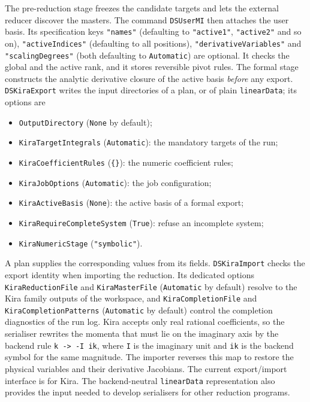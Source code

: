 \documentclass[11pt,a4paper]{article}
\begin{document}
The pre-reduction stage freezes the candidate
targets and lets the external reducer discover the
masters. The command \texttt{DSUserMI} then attaches the user basis. Its specification keys
\texttt{"names"} (defaulting to \texttt{"active1"}, \texttt{"active2"} and so on),
\texttt{"activeIndices"} (defaulting to all positions), \texttt{"derivativeVariables"} and
\texttt{"scalingDegrees"} (both defaulting to \texttt{Automatic}) are optional. It checks the global
and the active rank, and it stores reversible pivot rules. The formal stage constructs the analytic
derivative closure of the active basis \emph{before} any export.
\texttt{DSKiraExport} writes the input directories of a plan, or of plain \texttt{linearData}; its
options are
\begin{itemize}
\item \texttt{OutputDirectory} (\texttt{None} by default);
\item \texttt{KiraTargetIntegrals} (\texttt{Automatic}): the mandatory targets of the run;
\item \texttt{KiraCoefficientRules} (\texttt{\{\}}): the numeric coefficient rules;
\item \texttt{KiraJobOptions} (\texttt{Automatic}): the job configuration;
\item \texttt{KiraActiveBasis} (\texttt{None}): the active basis of a formal export;
\item \texttt{KiraRequireCompleteSystem} (\texttt{True}): refuse an incomplete system;
\item \texttt{KiraNumericStage} (\texttt{"symbolic"}).
\end{itemize}
A plan supplies the corresponding values from its fields.
\texttt{DSKiraImport} checks the export identity when importing the reduction. Its dedicated
options \texttt{KiraReductionFile} and \texttt{KiraMasterFile} (\texttt{Automatic} by default)
resolve to the Kira family outputs of the workspace, and \texttt{KiraCompletionFile} and
\texttt{KiraCompletionPatterns} (\texttt{Automatic} by default) control the completion diagnostics
of the run log. Kira accepts only
real rational coefficients, so the serialiser rewrites the momenta that must lie on the imaginary
axis by the backend rule \texttt{k -> -I ik}, where \texttt{I} is the imaginary unit and \texttt{ik}
is the backend symbol for the same magnitude. The importer reverses this map to restore the
physical variables and their derivative Jacobians. The current export/import interface is for Kira.
The backend-neutral \texttt{linearData} representation also provides the input needed to develop
serialisers for other reduction programs.
\end{document}
